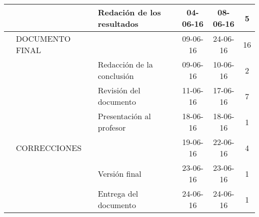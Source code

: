 \begin{table}[H]
{\begin{tabular}{lllccc}
     &                               & Redación de los resultados                         & 04-06-16                                                           & 08-06-16                                                            & 5                                                                  \\ \hline
     & DOCUMENTO FINAL               &                                                    & 09-06-16                                                           & 24-06-16                                                            & 16                                                                 \\
     &                               & Redacción de la conclusión                         & 09-06-16                                                           & 10-06-16                                                            & 2                                                                  \\
     &                               & Revisión del documento                             & 11-06-16                                                           & 17-06-16                                                            & 7                                                                  \\
     &                               & Presentación al profesor                           & 18-06-16                                                           & 18-06-16                                                            & 1                                                                  \\ \hline
     & CORRECCIONES                  &                                                    & 19-06-16                                                           & 22-06-16                                                            & 4                                                                  \\
     &                               & Versión final                                      & 23-06-16                                                           & 23-06-16                                                            & 1                                                                  \\
     &                               & Entrega del documento                              & 24-06-16                                                           & 24-06-16                                                            & 1                                                                  \\ \hline

\end{tabular}}
\end{table}
